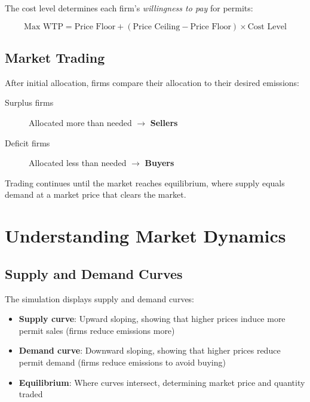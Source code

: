 \documentclass{tufte-handout}\usepackage[]{graphicx}\usepackage[]{xcolor}
\begin{document}
The cost level determines each firm's \textit{willingness to pay} for permits:

\begin{equation}
\text{Max WTP} = \text{Price Floor} + (\text{Price Ceiling} - \text{Price Floor}) \times \text{Cost Level}
\end{equation}

\subsection{Market Trading}

After initial allocation, firms compare their allocation to their desired emissions:

\begin{description}
\item[Surplus firms] Allocated more than needed $\rightarrow$ \textbf{Sellers}
\item[Deficit firms] Allocated less than needed $\rightarrow$ \textbf{Buyers}
\end{description}


Trading continues until the market reaches equilibrium, where supply equals demand at a market price that clears the market.

\section{Understanding Market Dynamics}

\subsection{Supply and Demand Curves}

The simulation displays supply and demand curves:

\begin{itemize}
\item \textbf{Supply curve}: Upward sloping, showing that higher prices induce more permit sales (firms reduce emissions more)
\item \textbf{Demand curve}: Downward sloping, showing that higher prices reduce permit demand (firms reduce emissions to avoid buying)
\item \textbf{Equilibrium}: Where curves intersect, determining market price and quantity traded
\end{itemize}
\end{document}
